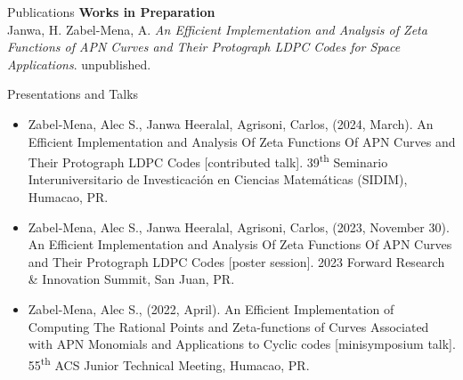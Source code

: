 \documentclass{resume} %
\begin{document}
\begin{rSection}{Publications}
    \textbf{Works in Preparation} \\
    \hspace*{10mm} Janwa, H. Zabel-Mena, A. \textit{An Efficient Implementation
      and Analysis of Zeta Functions of APN Curves and Their Protograph LDPC
      Codes for Space Applications}.
    \hspace*{10mm} unpublished.
\end{rSection}

\begin{rSection}{Presentations and Talks}
    \begin{itemize}
        \item Zabel-Mena, Alec S., Janwa Heeralal, Agrisoni, Carlos, (2024,
          March). An Efficient Implementation and Analysis Of Zeta Functions Of
          APN Curves and Their Protograph LDPC Codes [contributed talk].
          39\textsuperscript{th} Seminario Interuniversitario de Investicaci\'on en
          Ciencias Matem\'aticas (SIDIM), Humacao, PR.

        \item Zabel-Mena, Alec S., Janwa Heeralal, Agrisoni, Carlos, (2023,
          November 30). An Efficient Implementation and Analysis Of Zeta Functions
          Of APN Curves and Their Protograph LDPC Codes [poster session]. 2023
          Forward Research & Innovation Summit, San Juan, PR.

        \item Zabel-Mena, Alec S., (2022, April). An Efficient Implementation
            of Computing The Rational Points and Zeta-functions of Curves Associated
            with APN Monomials and Applications to Cyclic codes [minisymposium
            talk]. 55\textsuperscript{th} ACS Junior Technical Meeting, Humacao,
            PR.
    \end{itemize}
\end{rSection}
\end{document}
